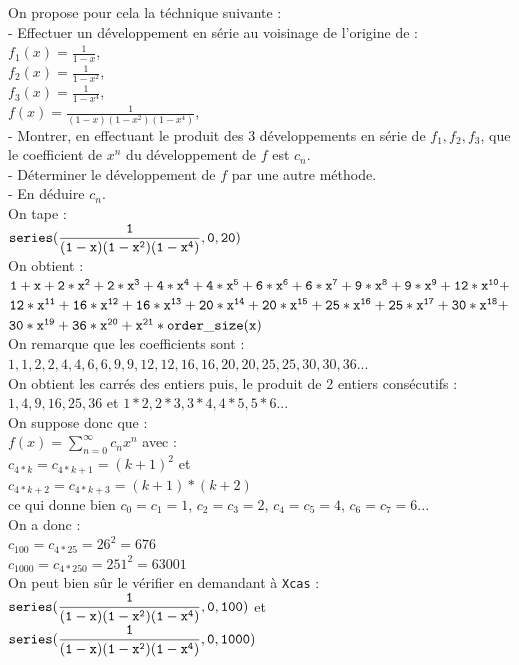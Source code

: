 \documentclass[a4paper,11pt]{book}
\begin{document}
On propose pour cela la t\'echnique suivante :\\
- Effectuer un d\'eveloppement en s\'erie au voisinage de l'origine de :\\
$\displaystyle f_1(x)=\frac{1}{1-x}$,\\
$\displaystyle f_2(x)=\frac{1}{1-x^2}$,\\
$\displaystyle f_3(x)=\frac{1}{1-x^4}$,\\
$\displaystyle f(x)=\frac{1}{(1-x)(1-x^2)(1-x^4)}$,\\  
- Montrer, en effectuant le produit des 3 d\'eveloppements en s\'erie de 
$f_1,f_2,f_3$, que le coefficient de $x^n$ du d\'eveloppement de $f$ est $c_n$.\\
- D\'eterminer le d\'eveloppement de $f$ par une autre m\'ethode.\\
- En d\'eduire $c_n$.\\

On tape :\\
$\displaystyle {\tt series(\frac{1}{(1-x)(1-x^2)(1-x^4)},0,20)}$\\
On obtient :\\
${\tt 1+x+2*x^2+2*x^3+4*x^4+4*x^5+6*x^6+6*x^7+9*x^8+9*x^9+12*x^{10}+}$\\
${\tt 12*x^{11}+16*x^{12}+16*x^{13}+20*x^{14}+20*x^{15}+25*x^{16}+25*x^{17}+30*x^{18}+}$\\
${\tt 30*x^{19}+36*x^{20}+x^{21}*order\_size(x)}$\\
On remarque que les coefficients sont :\\
$1,1,2,2,4,4,6,6,9,9,12,12,16,16,20,20,25,25,30,30,36...$\\
On obtient les carr\'es des entiers puis, le produit de 2 entiers cons\'ecutifs :\\
$1,4,9,16,25,36$ et $1*2,2*3,3*4,4*5,5*6...$\\
On suppose donc que :\\
$f(x)=\sum_{n=0}^\infty c_nx^n$ avec :\\
$c_{4*k}=c_{4*k+1}=(k+1)^2$ et \\
$c_{4*k+2}=c_{4*k+3}=(k+1)*(k+2)$\\
 ce qui donne bien  $c_0=c_1=1$, $c_2=c_3=2$, $c_4=c_5=4$, $c_6=c_7=6...$\\
On a donc :\\
$c_{100}=c_{4*25}=26^2=676$\\
$c_{1000}=c_{4*250}=251^2=63001$\\
On peut bien s\^ur le v\'erifier en demandant \`a {\tt Xcas} :\\ 
$\displaystyle {\tt series(\frac{1}{(1-x)(1-x^2)(1-x^4)},0,100)}$  et\\ 
$\displaystyle {\tt series(\frac{1}{(1-x)(1-x^2)(1-x^4)},0,1000)}$\\
\end{document}
